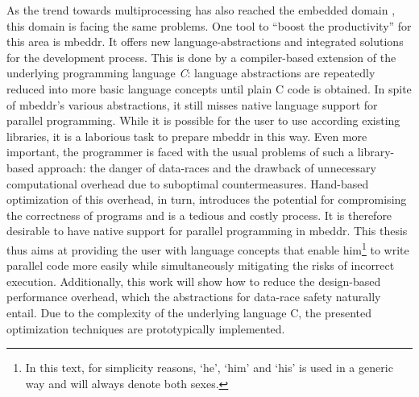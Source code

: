 As the trend towards multiprocessing has also reached the embedded domain \cite{MulticoreChallenges}\cite{LeveragingTheBenefits}, this domain is facing the same problems. One tool to ``boost the productivity''\cite{mbeddr} for this area is mbeddr. It offers new language-abstractions and integrated solutions for the development process. This is done by a compiler-based extension of the underlying programming language \textit{C}: language abstractions are repeatedly reduced into more basic language concepts until plain C code is obtained. In spite of mbeddr's various abstractions, it still misses native language support for parallel programming. While it is possible for the user to use according existing libraries, it is a laborious task to prepare mbeddr in this way. Even more important, the programmer is faced with the usual problems of such a library-based approach: the danger of data-races and the drawback of unnecessary computational overhead due to suboptimal countermeasures. Hand-based optimization of this overhead, in turn, introduces the potential for compromising the correctness of programs and is a tedious and costly process. It is therefore desirable to have native support for parallel programming in mbeddr. This thesis thus aims at providing the user with language concepts that enable him\footnote{In this text, for simplicity reasons, `he', `him' and `his' is used in a generic way and will always denote both sexes.} to write parallel code more easily while simultaneously mitigating the risks of incorrect execution. Additionally, this work will show how to reduce the design-based performance overhead, which the abstractions for data-race safety naturally entail. Due to the complexity of the underlying language C, the presented optimization techniques are prototypically implemented. 

